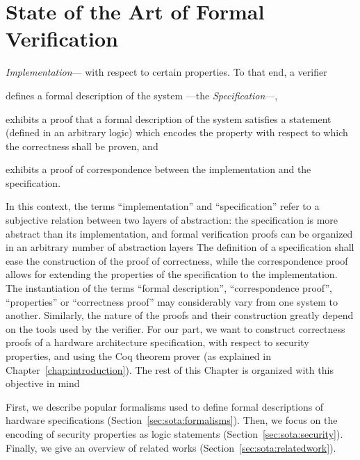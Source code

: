 \chapter{State of the Art of Formal Verification}
\label{chapter:relatedwork}


\vspace{1cm}\noindent
\emph{Implementation}--- with respect to certain properties.
%
To that end, a verifier
%
\begin{inparaenum}[(1)]
\item defines a formal description of the system ---the \emph{Specification}---,
\item exhibits a proof that a formal description of the system satisfies a
  statement (defined in an arbitrary logic) which encodes the property with
  respect to which the correctness shall be proven, and
\item exhibits a proof of correspondence between the implementation and the
  specification.
\end{inparaenum}
%
In this context, the terms ``implementation'' and ``specification'' refer to a
subjective relation between two layers of abstraction: the specification is more
abstract than its implementation, and formal verification proofs can be
organized in an arbitrary number of abstraction layers
%
The definition of a specification shall ease the construction of the proof of
correctness, while the correspondence proof allows for extending the properties
of the specification to the implementation.
%
The instantiation of the terms ``formal description'', ``correspondence proof'',
``properties'' or ``correctness proof'' may considerably vary from one system to
another.
%
Similarly, the nature of the proofs and their construction greatly depend on the
tools used by the verifier.
%
For our part, we want to construct correctness proofs of a hardware architecture
specification, with respect to security properties, and using the Coq theorem
prover (as explained in Chapter~\ref{chap:introduction}).
%
The rest of this Chapter is organized with this objective in mind

First, we describe popular formalisms used to define formal descriptions of
hardware specifications (Section~\ref{sec:sota:formalisms}).
%
Then, we focus on the encoding of security properties as logic statements
(Section~\ref{sec:sota:security}).
%
Finally, we give an overview of related works
(Section~\ref{sec:sota:relatedwork}).

